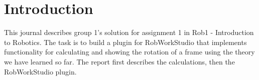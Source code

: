 
\section{Introduction}

This journal describes group 1's solution for assignment 1 in Rob1 - Introduction to Robotics. The task is to build a plugin for RobWorkStudio that implements functionality for calculating and showing the rotation of a frame using the theory we have learned so far. The report first describes the calculations, then the RobWorkStudio plugin.